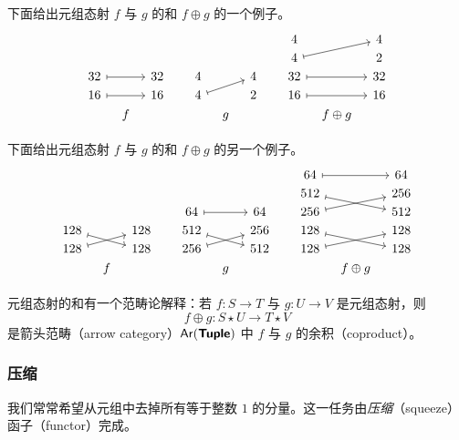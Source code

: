 \begin{example} \label{concatenationexample}
    下面给出元组态射 $f$ 与 $g$ 的和 $f \oplus g$ 的一个例子。
        \[
    \begin{tikzcd}[row sep = 1, column sep = 8]
    & & & & & & & & 4  & & 4 \\
      & & & & & & & &  4 \ar[rru,mapsto] & & 2\\
    32 \ar[rr, mapsto] & & 32 & & 4  & & 4 & & 32 \ar[rr,mapsto] & & 32\\
    16 \ar[rr,mapsto] & & 16 & & 4 \ar[rru ,mapsto]& & 2 & & 16 \ar[rr,mapsto] & & 16\\
    & f & & & & g & & & & f \oplus g  &  \\
    \end{tikzcd}
    \]
\end{example}

\begin{example}
    下面给出元组态射 $f$ 与 $g$ 的和 $f \oplus g$ 的另一个例子。
            \[
    \begin{tikzcd}[row sep = 1, column sep = 8]
    & & & & & & & & 64 \ar[rr,mapsto] & & 64 \\
    & & & & & & & & 512 \ar[rrd,mapsto]   & & 256 \\
      & & & & 64 \ar[rr,mapsto] & & 64& &  256 \ar[rru,mapsto] & & 512\\
    128 \ar[rrd, mapsto] & & 128 & & 512  \ar[rrd,mapsto] & & 256 & & 128 \ar[rrd,mapsto] & & 128\\
    128 \ar[rru,mapsto] & & 128 & & 256 \ar[rru ,mapsto]& & 512 & & 128 \ar[rru,mapsto] & & 128\\
    & f & & & & g & & & & f \oplus g  &  \\
    \end{tikzcd}
    \]
\end{example}

\begin{remark}
    元组态射的和有一个范畴论解释：若 $f:S \to T$ 与 $g:U \to V$ 是元组态射，则
    \[
    f \oplus g: S \star U \to T \star V
    \]
    是箭头范畴（arrow category）$\mathsf{Ar}({\boldsymbol{\mathsf{Tuple}}})$ 中 $f$ 与 $g$ 的余积（coproduct）。
\end{remark}

\subsubsection{压缩}

我们常常希望从元组中去掉所有等于整数 $1$ 的分量。这一任务由{\it 压缩}（squeeze）函子（functor）完成。

